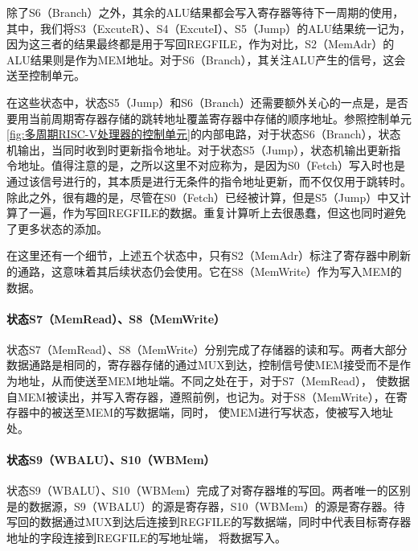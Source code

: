 除了S6（Branch）之外，其余的ALU结果都会写入寄存器等待下一周期的使用，其中，我们将S3（ExcuteR）、S4（ExcuteI）、S5（Jump）的ALU结果统一记为，因为这三者的结果最终都是用于写回REGFILE，作为对比，S2（MemAdr）的ALU结果则是作为MEM地址。对于S6（Branch），其关注ALU产生的信号，这会送至控制单元。

在这些状态中，状态S5（Jump）和S6（Branch）还需要额外关心的一点是，是否要用当前周期寄存器存储的跳转地址覆盖寄存器中存储的顺序地址。参照控制单元\cref{fig:多周期RISC-V处理器的控制单元}的内部电路，对于状态S6（Branch），状态机输出，当同时收到时更新指令地址。对于状态S5（Jump），状态机输出更新指令地址。值得注意的是，之所以这里不对应称为，是因为S0（Fetch）写入时也是通过该信号进行的，其本质是进行无条件的指令地址更新，而不仅仅用于跳转时。除此之外，很有趣的是，尽管在S0（Fetch）已经被计算，但是S5（Jump）中又计算了一遍，作为写回REGFILE的数据。重复计算听上去很愚蠢，但这也同时避免了更多状态的添加。

在这里还有一个细节，上述五个状态中，只有S2（MemAdr）标注了寄存器中刷新的通路，这意味着其后续状态仍会使用。它在S8（MemWrite）作为写入MEM的数据。

\paragraph{状态S7（MemRead）、S8（MemWrite）}
状态S7（MemRead）、S8（MemWrite）分别完成了存储器的读和写。两者大部分数据通路是相同的，寄存器存储的通过MUX到达，控制信号使MEM接受而不是作为地址，从而使送至MEM地址端。不同之处在于，对于S7（MemRead）， 使数据\code{[imm(rs1)]}自MEM被读出，并写入寄存器，遵照前例，也记为。对于S8（MemWrite），在寄存器中的被送至MEM的写数据端，同时， 使MEM进行写状态，使被写入地址处。

\paragraph{状态S9（WBALU）、S10（WBMem）}
状态S9（WBALU）、S10（WBMem）完成了对寄存器堆的写回。两者唯一的区别是的数据源，S9（WBALU）的源是寄存器，S10（WBMem）的源是寄存器。待写回的数据通过MUX到达后连接到REGFILE的写数据端，同时中代表目标寄存器地址的字段连接到REGFILE的写地址端， 将数据写入。

